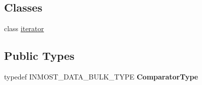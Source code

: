 \subsection*{Classes}
\begin{DoxyCompactItemize}
\item 
class \hyperlink{classINMOST_1_1ElementSet_1_1iterator}{iterator}
\end{DoxyCompactItemize}
\subsection*{Public Types}
\begin{DoxyCompactItemize}
\item 
\hypertarget{classINMOST_1_1ElementSet_aa2d038b0def08087dc87e30ea4ba6f36}{typedef I\-N\-M\-O\-S\-T\-\_\-\-D\-A\-T\-A\-\_\-\-B\-U\-L\-K\-\_\-\-T\-Y\-P\-E {\bfseries Comparator\-Type}}\label{classINMOST_1_1ElementSet_aa2d038b0def08087dc87e30ea4ba6f36}

\end{DoxyCompactItemize}

